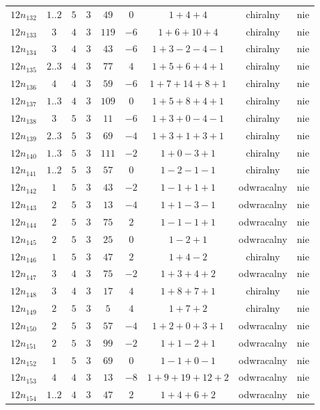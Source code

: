 \begin{longtable}{ccccccccc}
$12n_{132}$ & $1..2$ & $5$ & $3$ & $49$ & $0$ & $1+4+4$ & chiralny & nie \\
$12n_{133}$ & $3$ & $4$ & $3$ & $119$ & $-6$ & $1+6+10+4$ & chiralny & nie \\
$12n_{134}$ & $3$ & $4$ & $3$ & $43$ & $-6$ & $1+3-2-4-1$ & chiralny & nie \\
$12n_{135}$ & $2..3$ & $4$ & $3$ & $77$ & $4$ & $1+5+6+4+1$ & chiralny & nie \\
$12n_{136}$ & $4$ & $4$ & $3$ & $59$ & $-6$ & $1+7+14+8+1$ & chiralny & nie \\
$12n_{137}$ & $1..3$ & $4$ & $3$ & $109$ & $0$ & $1+5+8+4+1$ & chiralny & nie \\
$12n_{138}$ & $3$ & $5$ & $3$ & $11$ & $-6$ & $1+3+0-4-1$ & chiralny & nie \\
$12n_{139}$ & $2..3$ & $5$ & $3$ & $69$ & $-4$ & $1+3+1+3+1$ & chiralny & nie \\
$12n_{140}$ & $1..3$ & $5$ & $3$ & $111$ & $-2$ & $1+0-3+1$ & chiralny & nie \\
$12n_{141}$ & $1..2$ & $5$ & $3$ & $57$ & $0$ & $1-2-1-1$ & chiralny & nie \\
$12n_{142}$ & $1$ & $5$ & $3$ & $43$ & $-2$ & $1-1+1+1$ & odwracalny & nie \\
$12n_{143}$ & $2$ & $5$ & $3$ & $13$ & $-4$ & $1+1-3-1$ & odwracalny & nie \\
$12n_{144}$ & $2$ & $5$ & $3$ & $75$ & $2$ & $1-1-1+1$ & odwracalny & nie \\
$12n_{145}$ & $2$ & $5$ & $3$ & $25$ & $0$ & $1-2+1$ & odwracalny & nie \\
$12n_{146}$ & $1$ & $5$ & $3$ & $47$ & $2$ & $1+4-2$ & chiralny & nie \\
$12n_{147}$ & $3$ & $4$ & $3$ & $75$ & $-2$ & $1+3+4+2$ & odwracalny & nie \\
$12n_{148}$ & $3$ & $4$ & $3$ & $17$ & $4$ & $1+8+7+1$ & chiralny & nie \\
$12n_{149}$ & $2$ & $5$ & $3$ & $5$ & $4$ & $1+7+2$ & chiralny & nie \\
$12n_{150}$ & $2$ & $5$ & $3$ & $57$ & $-4$ & $1+2+0+3+1$ & odwracalny & nie \\
$12n_{151}$ & $2$ & $5$ & $3$ & $99$ & $-2$ & $1+1-2+1$ & odwracalny & nie \\
$12n_{152}$ & $1$ & $5$ & $3$ & $69$ & $0$ & $1-1+0-1$ & odwracalny & nie \\
$12n_{153}$ & $4$ & $4$ & $3$ & $13$ & $-8$ & $1+9+19+12+2$ & odwracalny & nie \\
$12n_{154}$ & $1..2$ & $4$ & $3$ & $47$ & $2$ & $1+4+6+2$ & odwracalny & nie \\

\end{longtable}
